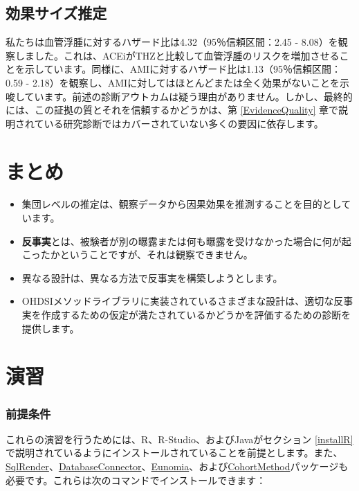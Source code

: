 \documentclass[
  11pt]{book}
\makeatletter
\newenvironment{kframe}{%
\medskip{}
\setlength{\fboxsep}{.8em}
 \def\at@end@of@kframe{}%
 \ifinner\ifhmode%
  \def\at@end@of@kframe{\end{minipage}}%
  \begin{minipage}{\columnwidth}%
 \fi\fi%
 \def\FrameCommand##1{\hskip\@totalleftmargin \hskip-\fboxsep
 \colorbox{myShadeColor}{##1}\hskip-\fboxsep
     \hskip-\linewidth \hskip-\@totalleftmargin \hskip\columnwidth}%
 \MakeFramed {\advance\hsize-\width
   \@totalleftmargin\z@ \linewidth\hsize
   \@setminipage}}%
 {\par\unskip\endMakeFramed%
 \at@end@of@kframe}
\newenvironment{rmdblock}[1]
  {
  \begin{itemize}
  \renewcommand{\labelitemi}{
    \raisebox{-.7\height}[0pt][0pt]{
      {\setkeys{Gin}{width=3em,keepaspectratio}\texttt{[image: images/\#1]}}
    }
  }
  \setlength{\fboxsep}{1em}
  \begin{kframe}
  \item
  }
  {
  \end{kframe}
  \end{itemize}
  }
\newenvironment{rmdsummary}
  {\begin{rmdblock}{summary}}
  {\end{rmdblock}}
\theoremstyle{definition}
\theoremstyle{definition}
\theoremstyle{definition}
\theoremstyle{definition}
\theoremstyle{remark}
\makeatother
\begin{document}
\subsection{効果サイズ推定}\label{ux52b9ux679cux30b5ux30a4ux30baux63a8ux5b9a}

私たちは血管浮腫に対するハザード比は4.32（95％信頼区間：2.45 - 8.08）を観察しました。これは、ACEiがTHZと比較して血管浮腫のリスクを増加させることを示しています。同様に、AMIに対するハザード比は1.13（95％信頼区間：0.59 - 2.18）を観察し、AMIに対してはほとんどまたは全く効果がないことを示唆しています。前述の診断アウトカムは疑う理由がありません。しかし、最終的には、この証拠の質とそれを信頼するかどうかは、第 \ref{EvidenceQuality} 章で説明されている研究診断ではカバーされていない多くの要因に依存します。

\section{まとめ}\label{ux307eux3068ux3081-9}

\begin{rmdsummary}
\begin{itemize}
\item
  集団レベルの推定は、観察データから因果効果を推測することを目的としています。
\item
  \textbf{反事実}とは、被験者が別の曝露または何も曝露を受けなかった場合に何が起こったかということですが、それは観察できません。
\item
  異なる設計は、異なる方法で反事実を構築しようとします。
\item
  OHDSIメソッドライブラリに実装されているさまざまな設計は、適切な反事実を作成するための仮定が満たされているかどうかを評価するための診断を提供します。
\end{itemize}
\end{rmdsummary}

\section{演習}\label{ux6f14ux7fd2-7}

\subsubsection*{前提条件}\label{ux524dux63d0ux6761ux4ef6-7}

これらの演習を行うためには、R、R-Studio、およびJavaがセクション \ref{installR} で説明されているようにインストールされていることを前提とします。また、\href{https://ohdsi.github.io/SqlRender/}{SqlRender}、\href{https://ohdsi.github.io/DatabaseConnector/}{DatabaseConnector}、\href{https://ohdsi.github.io/Eunomia/}{Eunomia}、および\href{https://ohdsi.github.io/CohortMethod/}{CohortMethod}パッケージも必要です。これらは次のコマンドでインストールできます：
\end{document}
